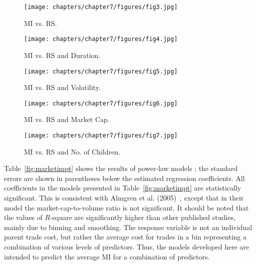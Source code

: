 	
	\begin{figure}[!ht]
	\centering
	\texttt{[image: chapters/chapter7/figures/fig3.jpg]}
	\caption{MI vs. RS. \label{fig:oneoffive}}
	\end{figure}

	\begin{figure}
	\centering
	\texttt{[image: chapters/chapter7/figures/fig4.jpg]}
	\caption{MI vs. RS and Duration. \label{fig:twooffive}}
	\end{figure}

	\begin{figure}
	\centering
	\texttt{[image: chapters/chapter7/figures/fig5.jpg]}
	\caption{MI vs. RS and Volatility. \label{fig:threeoffive}}
	\end{figure}

	\begin{figure}
	\centering
	\texttt{[image: chapters/chapter7/figures/fig6.jpg]}
	\caption{MI vs. RS and Market Cap. \label{fig:fouroffive}}
	\end{figure}

	\begin{figure}
	\centering
	\texttt{[image: chapters/chapter7/figures/fig7.jpg]}
	\caption{MI vs. RS and No. of Children. \label{fig:fiveoffive}}
	\end{figure}


Table~\ref{fig:marketimpt} shows the results of power-law models ; the standard errors are shown in parentheses below the estimated regression coefficients. All coefficients in the models presented in Table~\ref{fig:marketimpt} are statistically significant. This is consistent with Almgren et al. (2005)~\cite{athl}, except that in their model the market-cap-to-volume ratio is not significant. It should be noted that the values of $R$-square are significantly higher than other published studies, mainly due to binning and smoothing. The response variable is not an individual parent trade cost, but rather the average cost for trades in a bin representing a combination of various levels of predictors. Thus, the models developed here are intended to predict the average MI for a combination of predictors.


